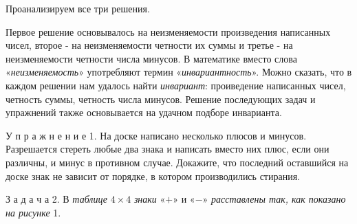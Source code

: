 \par\Large{Проанализируем все три решения.}
\par\Large{Первое решение основывалось на неизменяемости произведения написанных чисел, второе - на неизменяемости четности их суммы и третье - на неизменяемости четности числа минусов. В математике вместо слова «\textit{неизменяемость}» употребляют термин «\textit{инвариантность}». Можно сказать, что в каждом решении нам удалось найти \textit{инвариант}: проиведение написанных чисел, четность суммы, четность числа минусов. Решение последующих задач и упражнений также основывается на удачном подборе инварианта.}
\par\large{У п р а ж н е н и е  1. На доске написано несколько плюсов и минусов. Разрешается стереть любые два знака и написать вместо них плюс, если они различны, и минус в противном случае. Докажите, что последний оставшийся на доске знак не зависит от порядке, в котором производились стирания.}
\par\Large{З а д а ч а  2.   В \textit{таблице} $4\times{}4$ \textit{знаки} «$+$» и «$-$» \textit{расставлены так, как показано на рисунке} 1.}